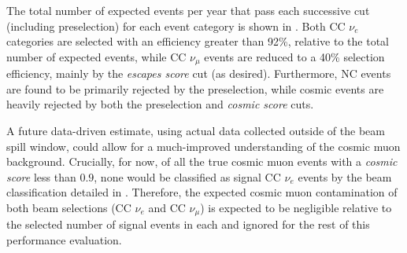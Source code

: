 The total number of expected events per year that pass each successive cut (including
preselection) for each event category is shown in . Both CC $\nu_{e}$
categories are selected with an efficiency greater than 92\%, relative to the total number of
expected events, while CC $\nu_{\mu}$ events are reduced to a 40\% selection efficiency, mainly by
the \emph{escapes score} cut (as desired). Furthermore, NC events are found to be primarily
rejected by the preselection, while cosmic events are heavily rejected by both the preselection
and \emph{cosmic score} cuts.

A future data-driven estimate, using actual \chipsfive data collected outside of the \numi beam
spill window, could allow for a much-improved understanding of the cosmic muon background.
Crucially, for now, of all the true cosmic muon events with a \emph{cosmic score} less than $0.9$,
none would be classified as signal CC $\nu_{e}$ events by the beam classification detailed in
. Therefore, the expected cosmic muon contamination of both beam
selections (CC $\nu_{e}$ and  CC $\nu_{\mu}$) is expected to be negligible relative to the
selected number of signal events in each and ignored for the rest of this performance evaluation.

\begin{table}
    \caption[Number of events passing successive selection cuts for each event category]
    {The total number of expected (weighted) events and the number that pass successive selection
        cuts for the different event categories. The preselection, \emph{cosmic score} cut, and
        \emph{escapes score} cut numbers are shown. The selection efficiency relative to the total
        number of events after all cuts have been applied is also shown for each event category.
        As zero out of the $350000$ cosmic events in the evaluation sample are selected after the
        \emph{cosmic score} cut, an upper limit on the values is instead given.}
    \label{tab:selection}
\end{table}

